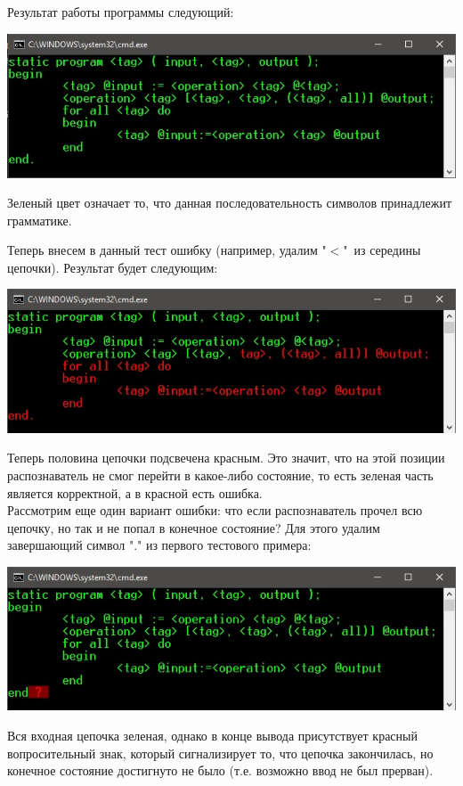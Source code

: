 \documentclass[12pt]{article}
\begin{document}
Результат работы программы следующий:\\

\begin{center}
\includegraphics[scale=1]{test1}
\end{center}
Зеленый цвет означает то, что данная последовательность символов принадлежит грамматике.

Теперь внесем в данный тест ошибку (например, удалим "$<$"\ из середины цепочки). Результат будет следующим:\\


\begin{center}
\includegraphics[scale=1]{test2}
\end{center}
Теперь половина цепочки подсвечена красным. Это значит, что на этой позиции распознаватель не смог перейти в какое-либо состояние, то есть зеленая часть является корректной, а в красной есть ошибка.
\\

Рассмотрим еще один вариант ошибки: что если распознаватель прочел всю цепочку, но так и не попал в конечное состояние? Для этого удалим завершающий символ "." из первого тестового примера:\\

\begin{center}
\includegraphics[scale=1]{test3}
\end{center}
Вся входная цепочка зеленая, однако в конце вывода присутствует красный вопросительный знак, который сигнализирует то, что цепочка закончилась, но конечное состояние достигнуто не было (т.е. возможно ввод не был прерван).
\end{document}
